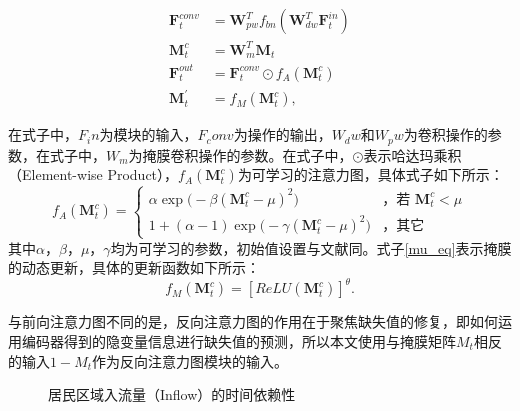 \vspace{-1em}
\begin{subequations}
\begin{align}
\mathbf{F}_{t}^{conv} & = \mathbf{W}^{T}_{pw}f_{bn}(\mathbf{W}^{T}_{dw}\mathbf{F}^{in}_t) \label{dsc_eq} \\
\mathbf{M}^{c}_{t} & = \mathbf{W}^{T}_{m}\mathbf{M}_t  \label{mc_eq}\\
\mathbf{F}_{t}^{out} & = \mathbf{F}_{t}^{conv} \odot f_{A}(\mathbf{M}^{c}_{t})  \label{fr_eq}\\
\mathbf{M}^{'}_{t} & = f_{M}(\mathbf{M}^{c}_{t}) \label{mu_eq},
\end{align}
\end{subequations}

在式子中，$F_in$为模块的输入，$F_conv$为操作的输出，$W_dw$和$W_pw$为卷积操作的参数，在式子中，$W_m$为掩膜卷积操作的参数。在式子中，$\odot$表示哈达玛乘积（Element-wise Product），$f_{A}(\mathbf{M}^{c}_{t})$为可学习的注意力图，具体式子如下所示：
\begin{equation}
    f_{A}(\mathbf{M}^{c}_{t})=
   \begin{cases}
   	\alpha \exp{\big (-\beta(\mathbf{M}^{c}_{t} - \mu)^2 \big)} &\mbox{，若 $\mathbf{M}^{c}_{t} < \mu$}\\
   	1 + (\alpha - 1) \exp{\big ( - \gamma(\mathbf{M}^{c}_{t} - \mu)^2 \big)} &\mbox{，其它}
   \end{cases}
\end{equation}
其中$\alpha$，$\beta$，$\mu$，$\gamma$均为可学习的参数，初始值设置与文献\cite[8861]{xie2019image}同。式子\eqref{mu_eq}表示掩膜的动态更新，具体的更新函数如下所示：
\begin{equation}
    f_{M}(\mathbf{M}^{c}_{t}) = \left [ ReLU(\mathbf{M}^{c}_{t}) \right ]^{\theta}.
\end{equation}

与前向注意力图不同的是，反向注意力图的作用在于聚焦缺失值的修复，即如何运用编码器得到的隐变量信息进行缺失值的预测，所以本文使用与掩膜矩阵$M_t$相反的输入$1-M_t$作为反向注意力图模块的输入。

\begin{figure}[htbp] 
	\centering 
	\caption{居民区域入流量（Inflow）的时间依赖性\cite[4]{zhang2017deep}} \label{residual}
\end{figure}

